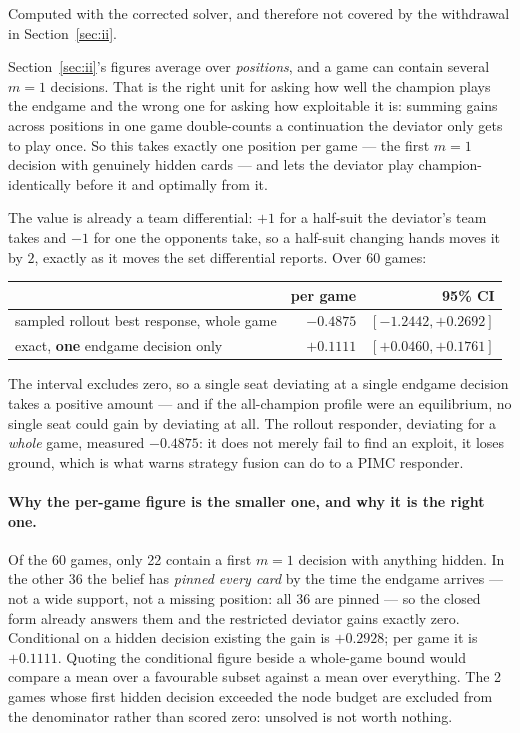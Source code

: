 \documentclass[11pt,a4paper]{article}
\begin{document}
Computed with the corrected solver, and therefore not covered by the
withdrawal in Section~\ref{sec:ii}.

Section~\ref{sec:ii}'s figures average over \emph{positions}, and a game can
contain several $m = 1$ decisions. That is the right unit for asking how well
the champion plays the endgame and the wrong one for asking how exploitable it
is: summing gains across positions in one game double-counts a continuation the
deviator only gets to play once. So this takes exactly one position per game ---
the first $m = 1$ decision with genuinely hidden cards --- and lets the deviator
play champion-identically before it and optimally from it.

The value is already a team differential: $+1$ for a half-suit the deviator's
team takes and $-1$ for one the opponents take, so a half-suit changing hands
moves it by $2$, exactly as it moves the set differential
 reports. Over 60 games:

\begin{center}
\begin{tabular}{lrr}
\toprule
 & per game & 95\% CI \\
\midrule
sampled rollout best response, whole game & $-0.4875$ & $[-1.2442, +0.2692]$ \\
exact, \textbf{one} endgame decision only & $\mathbf{+0.1111}$ & $[+0.0460, +0.1761]$ \\
\bottomrule
\end{tabular}
\end{center}

The interval excludes zero, so a single seat deviating at a single endgame
decision takes a positive amount --- and if the all-champion profile were an
equilibrium, no single seat could gain by deviating at all. The rollout
responder, deviating for a \emph{whole} game, measured $-0.4875$: it does not
merely fail to find an exploit, it loses ground, which is what
 warns strategy fusion can do to a PIMC
responder.

\paragraph{Why the per-game figure is the smaller one, and why it is the right
one.} Of the 60 games, only 22 contain a first $m = 1$ decision with
anything hidden. In the other 36 the belief has \emph{pinned every card} by
the time the endgame arrives --- not a wide support, not a missing position:
all 36 are pinned --- so the closed form already answers them and the
restricted deviator gains exactly zero. Conditional on a hidden decision
existing the gain is $+0.2928$; per game it is $+0.1111$. Quoting the conditional
figure beside a whole-game bound would compare a mean over a favourable subset
against a mean over everything. The 2 games whose first hidden decision
exceeded the node budget are excluded from the denominator rather than scored
zero: unsolved is not worth nothing.
\end{document}
